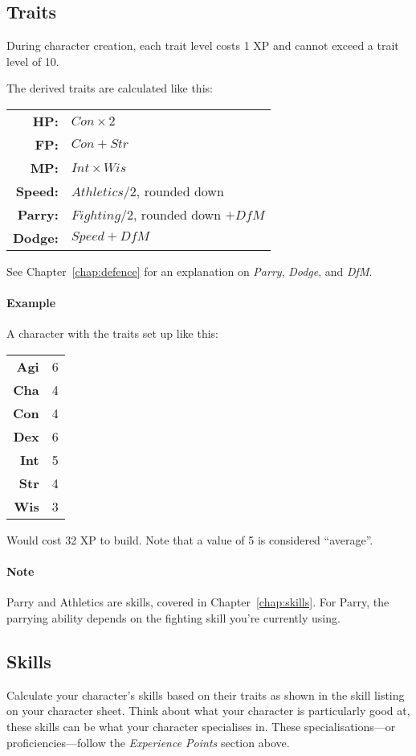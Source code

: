 \subsection{Traits}
During character creation, each trait level costs 1 XP and cannot exceed a trait level of 10.

The derived traits are calculated like this:

\begin{tabular} {r | l} 
\textbf{HP:} & $Con \times 2$ \\
\textbf{FP:} & $Con + Str$ \\
\textbf{MP:} & $Int \times Wis$ \\
\textbf{Speed:} & $Athletics / 2$, rounded down\\
\textbf{Parry:} & $Fighting / 2$, rounded down $+ \mathit{DfM}$\\
\textbf{Dodge:} & $Speed + \mathit{DfM}$ \\
\end{tabular}

See Chapter~\ref{chap:defence} for an explanation on \textit{Parry}, \textit{Dodge}, and \textit{DfM}.

\paragraph{Example} A character with the traits set up like this:

\begin{tabular}{r | l}
    \textbf{Agi} & 6\\
    \textbf{Cha} & 4\\
    \textbf{Con} & 4\\
    \textbf{Dex} & 6\\
    \textbf{Int} & 5\\
    \textbf{Str} & 4\\
    \textbf{Wis} & 3\\
\end{tabular}

Would cost 32 XP to build.
Note that a value of 5 is considered ``average''.

\paragraph{Note} Parry and Athletics are skills, covered in Chapter~\ref{chap:skills}.
For Parry, the parrying ability depends on the fighting skill you're currently using.

\subsection{Skills}
Calculate your character's skills based on their traits as shown in the skill listing on your character sheet.
Think about what your character is particularly good at, these skills can be what your character specialises in.
These specialisations---or proficiencies---follow the \textit{Experience Points} section above.

